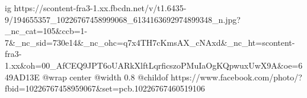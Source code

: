  
 
 
 
 

\ifcmt
  ig https://scontent-fra3-1.xx.fbcdn.net/v/t1.6435-9/194655357_10226767458999068_6134163692974899348_n.jpg?_nc_cat=105&ccb=1-7&_nc_sid=730e14&_nc_ohc=q7x4TH7cKmsAX_cNAxd&_nc_ht=scontent-fra3-1.xx&oh=00_AfCEQ9JPT6oUARkXlftLqrficszoPMuIaOgKQpwuxUwX9A&oe=649AD13E
  @wrap center
  @width 0.8
  @childof https://www.facebook.com/photo/?fbid=10226767458959067&set=pcb.10226767460519106
\fi
